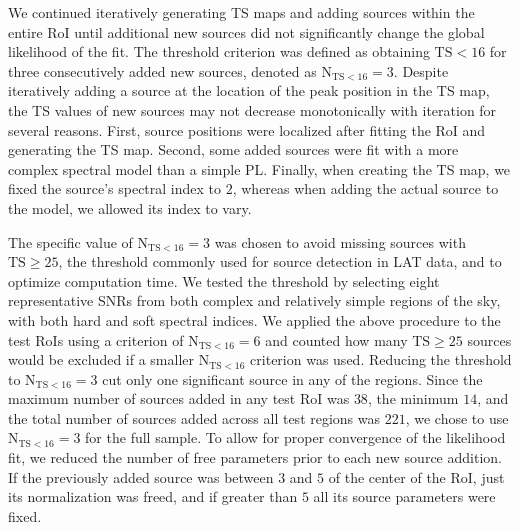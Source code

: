 {We continued iteratively generating TS maps and adding sources within the entire RoI until additional new sources did not significantly change the global likelihood of the fit. The threshold criterion was defined as obtaining $\mathrm{TS < 16}$ for three consecutively added new sources, denoted as $\mathrm{N_{TS < 16} = 3}$. Despite iteratively adding a source at the location of the peak position in the TS map, the TS values of new sources may not decrease monotonically with iteration for several reasons. First, source positions were localized after fitting the RoI and generating the TS map. Second, some added sources were fit with a more complex spectral model than a simple PL. Finally, when creating the TS map, we fixed the source's spectral index to $2$, whereas when adding the actual source to the model, we allowed its index to vary. 

The specific value of $\mathrm{N_{TS < 16} = 3}$ was chosen to avoid missing sources with $\mathrm{TS \geq 25}$, the threshold commonly used for source detection in LAT data, and to optimize computation time. We tested the threshold by selecting eight representative SNRs from both complex and relatively simple regions of the sky, with both hard and soft spectral indices. We applied the above procedure to the test RoIs using a criterion of $\mathrm{N_{TS < 16} = 6}$ and counted how many $\mathrm{TS \geq 25}$ sources would be excluded if a smaller $\mathrm{N_{TS < 16}}$ criterion was used. Reducing the threshold to $\mathrm{N_{TS < 16} = 3}$ cut only one significant source in any of the regions. Since the maximum number of sources added in any test RoI was $38$, the minimum $14$, and the total number of sources added across all test regions was $221$, we chose to use $\mathrm{N_{TS < 16} = 3}$ for the full sample. To allow for proper convergence of the likelihood fit, we reduced the number of free parameters prior to each new source addition. If the previously added source was between $3$\degr{} and $5$\degr{} of the center of the RoI, just its normalization was freed, and if greater than $5$\degr{} all its source parameters were fixed.

}
